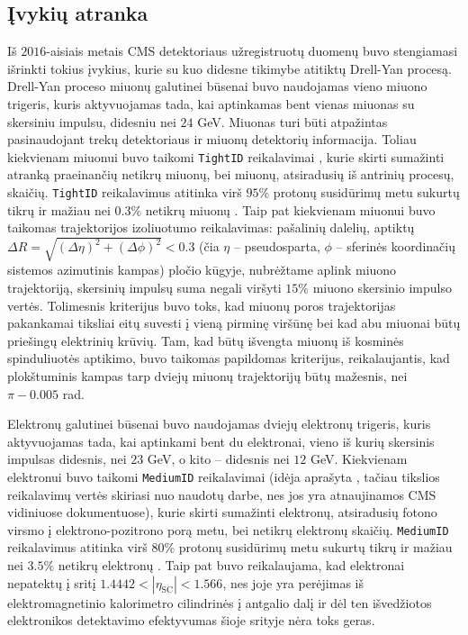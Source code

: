 \documentclass[a4paper, 12pt, twoside]{article}
\newcommand{\ttt}[1]{\texttt{#1}}
\newlength\q
\begin{document}
\subsection{Įvykių atranka}\label{sec:selection}
Iš $2016$-aisiais metais CMS detektoriaus užregistruotų duomenų buvo stengiamasi išrinkti tokius įvykius, kurie
su kuo didesne tikimybe atitiktų Drell-Yan procesą.
Drell-Yan proceso miuonų galutinei būsenai buvo naudojamas vieno miuono trigeris, kuris aktyvuojamas tada,
kai aptinkamas bent vienas miuonas su skersiniu impulsu, didesniu nei $24$ GeV.
Miuonas turi būti atpažintas pasinaudojant trekų detektoriaus ir miuonų detektorių informacija.
Toliau kiekvienam miuonui buvo taikomi \ttt{TightID} reikalavimai \cite{MuonID}, kurie skirti sumažinti atranką
praeinančių netikrų miuonų, bei miuonų, atsiradusių iš antrinių procesų, skaičių.
\ttt{TightID} reikalavimus atitinka virš $95\%$ protonų susidūrimų metu sukurtų tikrų ir mažiau nei $0.3\%$ netikrų
miuonų \cite{MuonID}.
Taip pat kiekvienam miuonui buvo taikomas trajektorijos izoliuotumo reikalavimas: pašalinių dalelių, aptiktų
$\Delta R = \sqrt{(\Delta\eta)^2 + (\Delta\phi)^2} < 0.3$ (čia $\eta$ -- pseudosparta, $\phi$ -- sferinės koordinačių
sistemos azimutinis kampas) pločio kūgyje, nubrėžtame aplink miuono trajektoriją, skersinių impulsų suma negali
viršyti $15\%$ miuono skersinio impulso vertės.
Tolimesnis kriterijus buvo toks, kad miuonų poros trajektorijas pakankamai tiksliai eitų suvesti į vieną pirminę
viršūnę bei kad abu miuonai būtų priešingų elektrinių krūvių.
Tam, kad būtų išvengta miuonų iš kosminės spinduliuotės aptikimo, buvo taikomas papildomas kriterijus, reikalaujantis,
kad plokštuminis kampas tarp dviejų miuonų trajektorijų būtų mažesnis, nei $\pi-0.005$ rad.

Elektronų galutinei būsenai buvo naudojamas dviejų elektronų trigeris, kuris aktyvuojamas tada, kai aptinkami
bent du elektronai, vieno iš kurių skersinis impulsas didesnis, nei $23$ GeV, o kito -- didesnis nei $12$ GeV.
Kiekvienam elektronui buvo taikomi \ttt{MediumID} reikalavimai (idėja aprašyta \cite{EleID}, tačiau tikslios
reikalavimų vertės skiriasi nuo naudotų darbe, nes jos yra atnaujinamos CMS vidiniuose dokumentuose), kurie
skirti sumažinti elektronų, atsiradusių fotono virsmo į elektrono-pozitrono porą metu, bei netikrų elektronų
skaičių.
\ttt{MediumID} reikalavimus atitinka virš $80\%$ protonų susidūrimų metu sukurtų tikrų ir mažiau nei $3.5\%$ netikrų
elektronų \cite{EleID}.
Taip pat buvo reikalaujama, kad elektronai nepatektų į sritį $1.4442<|\eta_{\mathrm{SC}}|<1.566$, nes joje
yra perėjimas iš elektromagnetinio kalorimetro cilindrinės į antgalio dalį ir dėl ten išvedžiotos elektronikos
detektavimo efektyvumas šioje srityje nėra toks geras.
\end{document}
